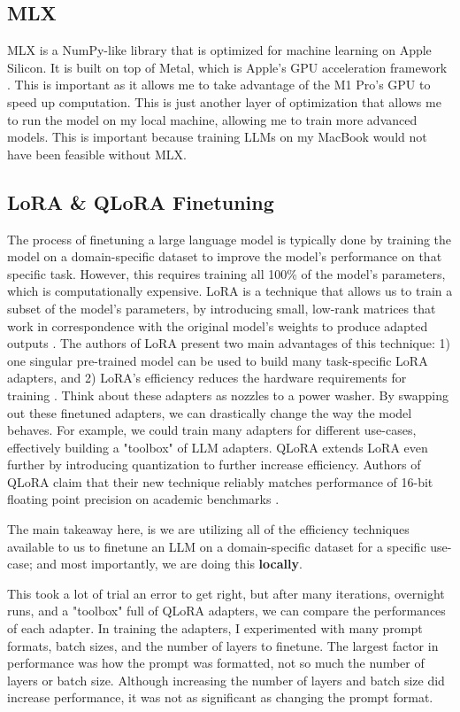 \documentclass[12pt]{article}
\begin{document}
\subsection{MLX}
MLX is a NumPy-like library that is optimized for machine learning on Apple Silicon. It is built on top of Metal, which is Apple's GPU acceleration framework \cite{mlx2023}. This is important as it allows me to take advantage of the M1 Pro's GPU to speed up computation. This is just another layer of optimization that allows me to run the model on my local machine, allowing me to train more advanced models. This is important because training LLMs on my MacBook would not have been feasible without MLX.

\subsection{LoRA \& QLoRA Finetuning}
The process of finetuning a large language model is typically done by training the model on a domain-specific dataset to improve the model's performance on that specific task. However, this requires training all 100\% of the model's parameters, which is computationally expensive. LoRA is a technique that allows us to train a subset of the model's parameters, by introducing small, low-rank matrices that work in correspondence with the original model's weights to produce adapted outputs \cite[page 2]{hu2021lora}. The authors of LoRA present two main advantages of this technique: 1) one singular pre-trained model can be used to build many task-specific LoRA adapters, and 2) LoRA's efficiency reduces the hardware requirements for training \cite[page 2]{hu2021lora}. Think about these adapters as nozzles to a power washer. By swapping out these finetuned adapters, we can drastically change the way the model behaves. For example, we could train many adapters for different use-cases, effectively building a "toolbox" of LLM adapters. QLoRA extends LoRA even further by introducing quantization to further increase efficiency. Authors of QLoRA claim that their new technique reliably matches performance of 16-bit floating point precision on academic benchmarks \cite[page 7]{dettmers2023qlora}.

The main takeaway here, is we are utilizing all of the efficiency techniques available to us to finetune an LLM on a domain-specific dataset for a specific use-case; and most importantly, we are doing this \textbf{locally}.

This took a lot of trial an error to get right, but after many iterations, overnight runs, and a "toolbox" full of QLoRA adapters, we can compare the performances of each adapter. In training the adapters, I experimented with many prompt formats, batch sizes, and the number of layers to finetune. The largest factor in performance was how the prompt was formatted, not so much the number of layers or batch size. Although increasing the number of layers and batch size did increase performance, it was not as significant as changing the prompt format.
\end{document}
